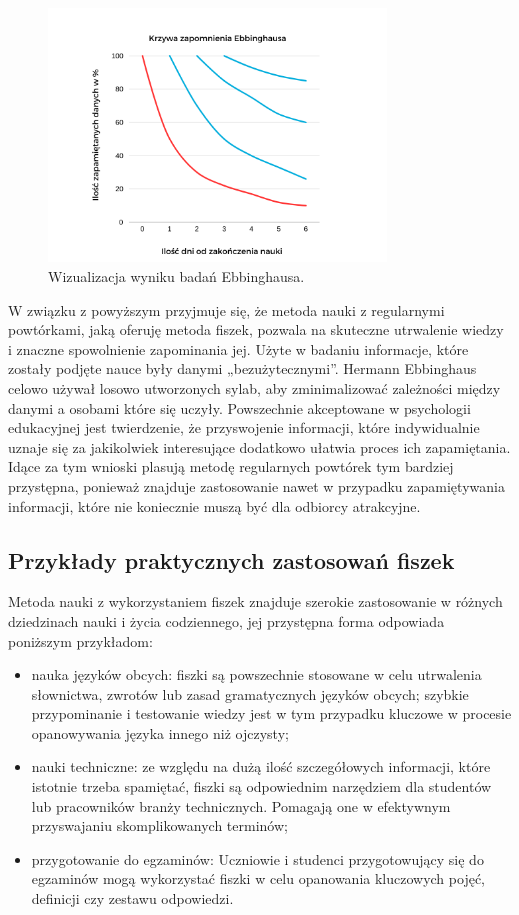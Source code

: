 \begin{figure}[H]
    \centering
    \includegraphics[width=0.8\textwidth]{chapters/chapter_2/krzywa2.png}
    \caption{Wizualizacja wyniku badań Ebbinghausa.}
    \label{img:krzywa2}
\end{figure}


W związku z powyższym przyjmuje się, że metoda nauki z regularnymi powtórkami, jaką oferuję metoda fiszek, pozwala na skuteczne utrwalenie wiedzy i znaczne spowolnienie zapominania jej. Użyte w badaniu informacje, które zostały podjęte nauce były danymi „bezużytecznymi”. Hermann Ebbinghaus celowo używał losowo utworzonych sylab, aby zminimalizować zależności między danymi a osobami które się uczyły. Powszechnie akceptowane w psychologii edukacyjnej jest twierdzenie, że przyswojenie informacji, które indywidualnie uznaje się za jakikolwiek interesujące dodatkowo ułatwia proces ich zapamiętania. Idące za tym wnioski plasują metodę regularnych powtórek tym bardziej przystępna, ponieważ znajduje zastosowanie nawet w przypadku zapamiętywania informacji, które nie koniecznie muszą być dla odbiorcy atrakcyjne.

\subsection{Przykłady praktycznych zastosowań fiszek}

Metoda nauki z wykorzystaniem fiszek znajduje szerokie zastosowanie w różnych dziedzinach nauki i życia codziennego, jej przystępna forma odpowiada poniższym przykładom:
\begin{itemize}
    \item nauka języków obcych: fiszki są powszechnie stosowane w celu utrwalenia słownictwa, zwrotów lub zasad gramatycznych języków obcych; szybkie przypominanie i testowanie wiedzy jest w tym przypadku kluczowe w procesie opanowywania języka innego niż ojczysty;
    \item nauki techniczne: ze względu na dużą ilość szczegółowych informacji, które istotnie trzeba spamiętać, fiszki są odpowiednim narzędziem dla studentów lub pracowników branży technicznych. Pomagają one w efektywnym przyswajaniu skomplikowanych terminów;
    \item przygotowanie do egzaminów: Uczniowie i studenci przygotowujący się do egzaminów mogą wykorzystać fiszki w celu opanowania kluczowych pojęć, definicji czy zestawu odpowiedzi.
\end{itemize}

